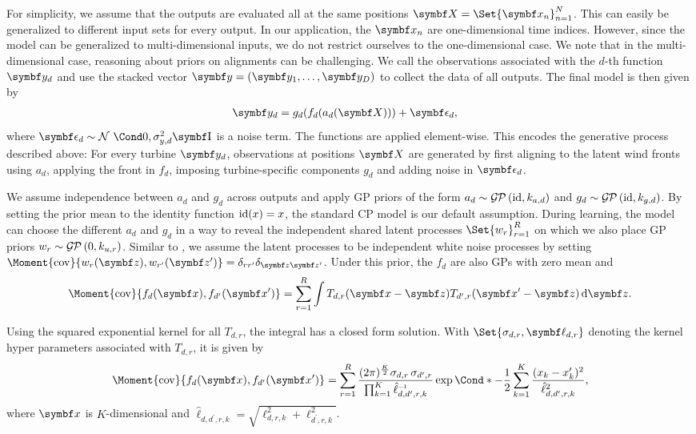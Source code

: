 For simplicity, we assume that the outputs are evaluated all at the same positions $\mat{X} = \Set{\mat{x}_n}_{n=1}^N$.
This can easily be generalized to different input sets for every output.
In our application, the $\mat{x}_n$ are one-dimensional time indices.
However, since the model can be generalized to multi-dimensional inputs, we do not restrict ourselves to the one-dimensional case.
We note that in the multi-dimensional case, reasoning about priors on alignments can be challenging.
We call the observations associated with the $d$-th function $\mat{y}_d$ and use the stacked vector $\mat{y} = \left( \mat{y}_1, \dots, \mat{y}_D \right)$ to collect the data of all outputs.
The final model is then given by
\begin{align}
    \mat{y}_d & = g_d(f_d(a_d(\mat{X}))) + \mat{\epsilon}_d,
\end{align}
where $\mat{\epsilon}_d \sim \Gaussian{0, \sigma_{y, d}^2\Eye}$ is a noise term.
The functions are applied element-wise.
This encodes the generative process described above:
For every turbine $\rv{y}_d$, observations at positions $\rv{X}$ are generated by first aligning to the latent wind fronts using $a_d$, applying the front in $f_d$, imposing turbine-specific components $g_d$ and adding noise in $\rv{\epsilon}_d$.

We assume independence between $a_d$ and $g_d$ across outputs and apply GP priors of the form $a_d \sim \operatorname{\mathcal{G\mkern-1mu P}\mkern3mu}(\operatorname{id}, k_{a, d})$ and $g_d \sim \operatorname{\mathcal{G\mkern-1mu P}\mkern3mu}(\operatorname{id}, k_{g, d})$.
By setting the prior mean to the identity function $\operatorname{id}(x) = x$, the standard CP model is our default assumption.
During learning, the model can choose the different $a_d$ and $g_d$ in a way to reveal the independent shared latent processes $\Set{w_r}_{r=1}^R$ on which we also place GP priors $w_r \sim \operatorname{\mathcal{G\mkern-1mu P}\mkern3mu}(0, k_{u, r})$.
Similar to \textcite{boyle_dependent_2004}, we assume the latent processes to be independent white noise processes by setting $\Moment{\cov}{w_r(\mat{z}), w_{r^\prime}(\mat{z^\prime})} = \delta_{rr^\prime}\delta_{\mat{z}\mat{z^\prime}}$.
Under this prior, the $f_d$ are also GPs with zero mean and
\begin{align}
    \Moment{\cov}{f_d(\mat{x}), f_{d^\prime}(\mat{x^\prime})}
    = \sum_{r=1}^R \int T_{d,r}(\mat{x} - \mat{z}) T_{d^\prime,r}(\mat{x^\prime} - \mat{z}) \diff \mat{z}.
\end{align}

Using the squared exponential kernel for all $T_{d, r}$, the integral has a closed form solution.
With $\Set{\sigma_{d,r}, \mat{\ell}_{d, r}}$ denoting the kernel hyper parameters associated with $T_{d,r}$, it is given by
\begin{align}
    \label{eq:alignment:dependent_kernel}
    \Moment{\cov}{f_d(\mat{x}), f_{d^\prime}(\mat{x^\prime})} = \sum_{r=1}^R \frac{(2\pi)^{\frac{K}{2}}\sigma_{d, r}\,\sigma_{d^\prime, r}}{\prod_{k=1}^K \hat{\ell}_{d, d^\prime, r, k}\inv} \Fun*{\exp}{-\frac{1}{2} \sum_{k=1}^K \frac{(x_k - x^\prime_k)^2}{\hat{\ell}_{d, d^\prime, r, k}^2}},
\end{align}
where $\mat{x}$ is $K$-dimensional and $\hat{\ell}_{d, d^\prime, r, k} = \sqrt{\ell_{d, r, k}^2 + \ell_{d^\prime, r, k}^2}$.

